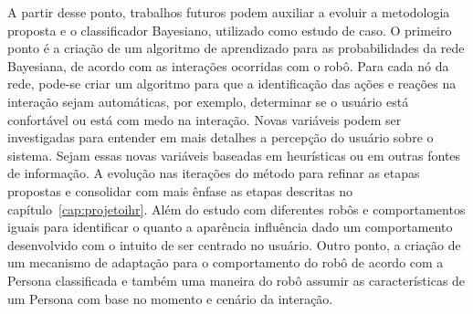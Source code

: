 A partir desse ponto, trabalhos futuros podem auxiliar a evoluir a metodologia proposta e o classificador Bayesiano, utilizado como estudo de caso. O primeiro ponto é a criação de um algoritmo de aprendizado para as probabilidades da rede Bayesiana, de acordo com as interações ocorridas com o robô. Para cada nó da rede, pode-se criar um algoritmo para que a identificação das ações e reações na interação sejam automáticas, por exemplo, determinar se o usuário está confortável ou está com medo na interação. Novas variáveis podem ser investigadas para entender em mais detalhes a percepção do usuário sobre o sistema. Sejam essas novas variáveis baseadas em heurísticas ou em outras fontes de informação. A evolução nas iterações do método para refinar as etapas propostas e consolidar com mais ênfase as etapas descritas no capítulo~\ref{cap:projetoihr}. Além do estudo com diferentes robôs e comportamentos iguais para identificar o quanto a aparência influência dado um comportamento desenvolvido com o intuito de ser centrado no usuário. Outro ponto, a criação de um mecanismo de adaptação para o comportamento do robô de acordo com a Persona classificada e também uma maneira do robô assumir as características de um Persona com base no momento e cenário da interação.